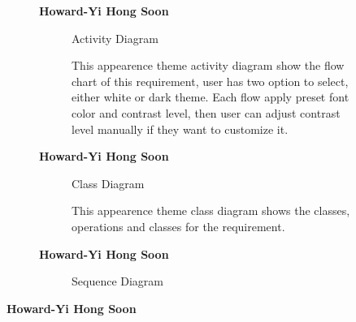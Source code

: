 \documentclass{article}
\begin{document}
		\begin{figure}[htbp]
			\textbf{Howard-Yi Hong Soon}
			\centering
			\begin{subfigure}{\textwidth}
				\resizebox{\textwidth}{!}{}
				\caption{Activity Diagram}
			\end{subfigure}
			\begin{subfigure}{\textwidth}
				This appearence theme activity diagram show the flow chart of this requirement, user has two option to select, either white or dark theme.
				Each flow apply preset font color and contrast level, then user can adjust contrast level manually if they want to customize it.
			\end{subfigure}
		\end{figure}
		

		\begin{figure}[htbp]
			\textbf{Howard-Yi Hong Soon}
			\centering
			\begin{subfigure}{\textwidth}
				\resizebox{\textwidth}{!}{}
				\caption{Class Diagram}
			\end{subfigure}
			\begin{subfigure}{\textwidth}
				This appearence theme class diagram shows the classes, operations and classes for the requirement.
			\end{subfigure}
		\end{figure}
		

		\begin{figure}[htbp]
			\textbf{Howard-Yi Hong Soon}
			\centering
			\begin{subfigure}{\textwidth}
				\resizebox{\textwidth}{!}{}
				\caption{Sequence Diagram}
			\end{subfigure}
			\begin{subfigure}{\textwidth}
			\end{subfigure}
		\end{figure}
		\newpage

		\textbf{Howard-Yi Hong Soon}
\end{document}
